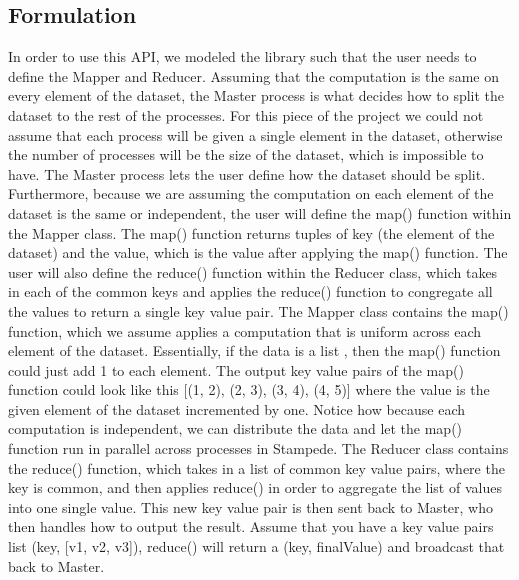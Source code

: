 \documentclass[11pt]{article}
\begin{document}
\subsection{Formulation}
In order to use this API, we modeled the library such that the user needs to define the Mapper and Reducer. Assuming that the computation is the same on every element of the dataset, the Master process is what decides how to split the dataset to the rest of the processes. For this piece of the project we could not assume that each process will be given a single element in the dataset, otherwise the number of processes will be the size of the dataset, which is impossible to have. 
\newline 
\indent The Master process lets the user define how the dataset should be split. Furthermore, because we are assuming the computation on each element of the dataset is the same or independent, the user will define the map() function within the Mapper class. The map() function returns tuples of key (the element of the dataset) and the value, which is the value after applying the map() function. The user will also define the reduce() function within the Reducer class, which takes in each of the common keys and applies the reduce() function to congregate all the values to return a single key value pair.
\newline
\indent The Mapper class contains the map() function, which we assume applies a computation that is uniform across each element of the dataset. Essentially, if the data is a list \newline [1, 2, 3, 4], then the map() function could just add 1 to each element. The output key value pairs of the map() function could look like this [(1, 2), (2, 3), (3, 4), (4, 5)] where the value is the given element of the dataset incremented by one. Notice how because each computation is independent, we can distribute the data and let the map() function run in parallel across processes in Stampede.
\newline
\indent
The Reducer class contains the reduce() function, which takes in a list of common key value pairs, where the key is common, and then applies reduce() in order to aggregate the list of values into one single value. This new key value pair is then sent back to Master, who then handles how to output the result. Assume that you have a key value pairs list (key, [v1, v2, v3]), reduce() will return a (key, finalValue) and broadcast that back to Master.
\end{document}

